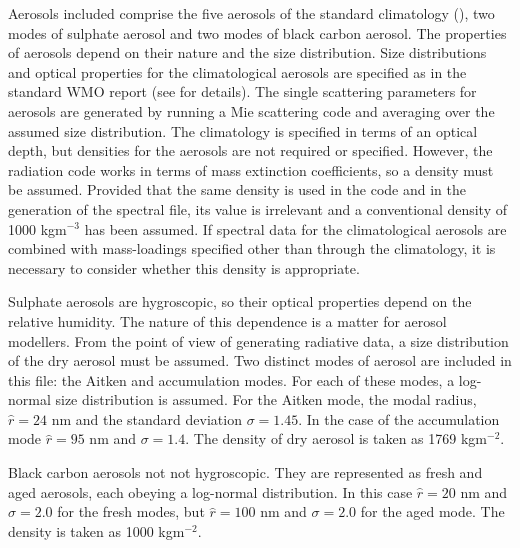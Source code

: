 \begin{enumerate}
Aerosols included comprise the five aerosols of the standard climatology
(\citet{Cusack98a}), two modes of sulphate aerosol and two modes of
black carbon aerosol.
The properties of aerosols depend on their nature and the size distribution.
Size distributions and optical properties for the climatological aerosols
are specified as in the standard WMO report (see \citet{Cusack98a} for
details). 
The single scattering parameters for aerosols are generated by running a 
Mie scattering code and averaging over the assumed size distribution.
The climatology is specified in terms of an optical depth, but densities
for the aerosols are not required or specified. However, the radiation
code works in terms of mass extinction coefficients, so a density must
be assumed. Provided that the same density is used in the code and in
the generation of the spectral file, its value is irrelevant and a 
conventional density of 1000 kgm${}^{-3}$ has been assumed. If spectral
data for the climatological aerosols are combined with mass-loadings
specified other than through the climatology, it is necessary to
consider whether this density is appropriate.

Sulphate aerosols are hygroscopic, so their optical properties depend on
the relative humidity. The nature of this dependence is a matter for
aerosol modellers. From the point of view of generating radiative data,
a size distribution of the dry aerosol must be assumed. Two distinct
modes of aerosol are included in this file: the Aitken and accumulation
modes. For each of these modes, a log-normal size distribution is assumed.
For the Aitken mode, the modal radius, $\hat r = 24$ nm and the 
standard deviation $\sigma=1.45$. In the case of the accumulation mode
$\hat r = 95$ nm and $\sigma=1.4$. The density of dry aerosol is taken
as 1769 kgm${}^{-2}$.

Black carbon aerosols not not hygroscopic. They are represented as fresh
and aged aerosols, each obeying a log-normal distribution. In this case
$\hat r = 20$ nm and $\sigma=2.0$ for the fresh modes, 
but $\hat r = 100$ nm and $\sigma=2.0$ for the aged mode. 
The density is taken as 1000 kgm${}^{-2}$.


\end{enumerate}
